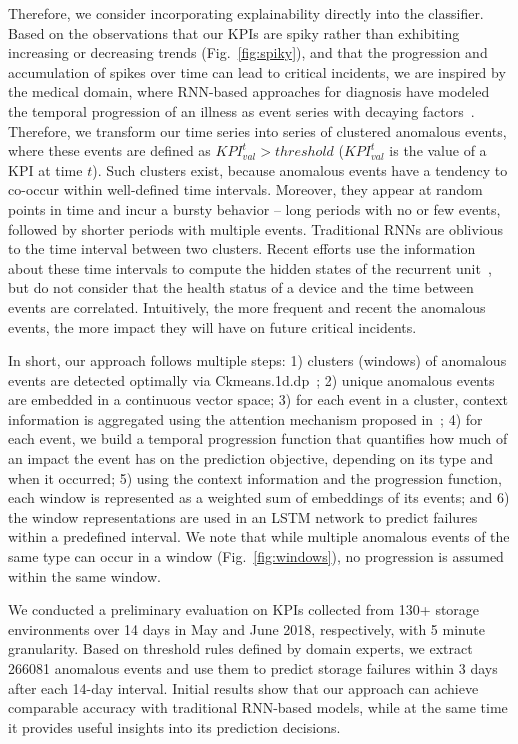 \documentclass[letterpaper]{article} %
\begin{document}
Therefore, we consider incorporating explainability directly into the classifier. Based on the observations that our KPIs are spiky rather than exhibiting increasing or decreasing trends (Fig.~\ref{fig:spiky}), and that the progression and accumulation of spikes over time can lead to critical incidents, we are inspired by the medical domain, where RNN-based approaches for diagnosis have modeled the temporal progression of an illness as event series with decaying factors~\cite{disease}. Therefore, we transform our time series into series of clustered anomalous events, where these events are defined as $KPI_{val}^{t} > threshold$ ($KPI_{val}^{t}$ is the value of a KPI at time $t$). Such clusters exist, because anomalous events have a tendency to co-occur within well-defined time intervals. Moreover, they appear at random points in time and incur a bursty behavior -- long periods with no or few events, followed by shorter periods with multiple events. Traditional RNNs are oblivious to the time interval between two clusters. Recent efforts use the information about these time intervals to compute the hidden states of the recurrent unit~\cite{rnnmultivariate,retain,irregularity}, but do not consider that the health status of a device and the time between events are correlated. Intuitively, the more frequent and recent the anomalous events, the more impact they will have on future critical incidents.

In short, our approach follows multiple steps: 1) clusters (windows) of anomalous events are detected optimally via Ckmeans.1d.dp~\cite{ckmeans}; 2) unique anomalous events are embedded in a continuous vector space; 3) for each event in a cluster, context information is aggregated using the attention mechanism proposed in~\cite{attention}; 4) for each event, we build a temporal progression function that quantifies how much of an impact the event has on the prediction objective, depending on its type and when it occurred; 5) using the context information and the progression function, each window is represented as a weighted sum of embeddings of its events; and 6) the window representations are used in an LSTM network to predict failures within a predefined interval. We note that while multiple anomalous events of the same type can occur in a window (Fig.~\ref{fig:windows}), no progression is assumed within the same window.

We conducted a preliminary evaluation on KPIs collected from 130+ storage environments over 14 days in May and June 2018, respectively, with 5 minute granularity. Based on threshold rules defined by domain experts, we extract 266081 anomalous events and use them to predict storage failures within 3 days after each 14-day interval. Initial results show that our approach can achieve comparable accuracy with traditional RNN-based models, while at the same time it provides useful insights into its prediction decisions.
\end{document}
